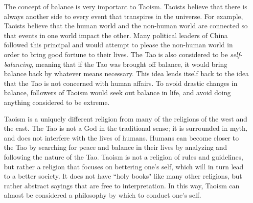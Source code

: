 \documentclass[12pt]{article}
\begin{document}
The concept of balance is very important to Taoism. Taoists believe that there is always another side to every event that transpires in the universe. For example, Taoists believe that the human world and the non-human world are connected so that events in one world impact the other. Many political leaders of China followed this principal and would attempt to please the non-human world in order to bring good fortune to their lives. The Tao is also considered to be \textit{self-balancing}, meaning that if the Tao was brought off balance, it would bring balance back by whatever means necessary. This idea lends itself back to the idea that the Tao is not concerned with human affairs. To avoid drastic changes in balance, followers of Taoism would seek out balance in life, and avoid doing anything considered to be extreme.

Taoism is a uniquely different religion from many of the religions of the west and the east. The Tao is not a God in the traditional sense; it is surrounded in myth, and does not interfere with the lives of humans. Humans can become closer to the Tao by searching for peace and balance in their lives by analyzing and following the nature of the Tao. Taoism is not a religion of rules and guidelines, but rather a religion that focuses on bettering one's self, which will in turn lead to a better society. It does not have ``holy books" like many other religions, but rather abstract sayings that are free to interpretation. In this way, Taoism can almost be considered a philosophy by which to conduct one's self.

\newpage

\nocite{*}
\printbibliography
\end{document}
